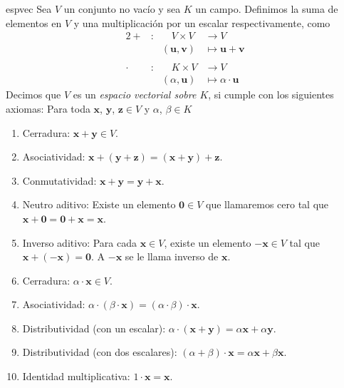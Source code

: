 \begin{definicion}{}{espvec}
    Sea $V$ un conjunto no vacío y sea $K$ un campo. Definimos la suma de elementos en $V$ y una multiplicación por un escalar respectivamente, como
    \begin{alignat*}{2}
        + &: & \quad V \times V & \longrightarrow V \\
        & & (\mathbf{u}, \mathbf{v}) & \longmapsto \mathbf{u} + \mathbf{v} \\
        & \\
        \cdot &: & \quad K \times V & \longrightarrow V \\
        & & (\alpha, \mathbf{u}) & \longmapsto \alpha \cdot \mathbf{u}
    \end{alignat*}
    Decimos que $V$ es un \emph{espacio vectorial sobre $K$}, si cumple con los siguientes axiomas: Para toda $\mathbf{x}$, $\mathbf{y}$, $\mathbf{z} \in V$ y $\alpha$, $\beta \in K$
    \begin{enumerate}[label=\roman*), topsep=6pt, itemsep=0pt]
        \item Cerradura: $\mathbf{x} + \mathbf{y} \in V$.
        \item Asociatividad: $\mathbf{x} + (\mathbf{y} + \mathbf {z}) = (\mathbf{x} + \mathbf{y}) + \mathbf{z}$.\newpage
        \item Conmutatividad: $\mathbf{x} + \mathbf{y} = \mathbf{y} + \mathbf{x}$.
        \item Neutro aditivo: Existe un elemento $\mathbf{0} \in V$ que llamaremos cero tal que $\mathbf{x} + \mathbf{0} = \mathbf{0} + \mathbf{x} = \mathbf{x}$.
        \item Inverso aditivo: Para cada $\mathbf{x} \in V$, existe un elemento $-\mathbf{x} \in V$ tal que $\mathbf{x} + (-\mathbf{x}) = \mathbf{0}$. A $-\mathbf{x}$ se le llama inverso de $\mathbf{x}$.
        \item Cerradura: $\alpha \cdot \mathbf{x} \in V$.
        \item Asociatividad: $\alpha \cdot (\beta \cdot \mathbf{x}) = (\alpha \cdot \beta) \cdot \mathbf{x}$.
        \item Distributividad (con un escalar): $\alpha \cdot (\mathbf{x} + \mathbf{y}) = \alpha \mathbf{x} + \alpha \mathbf{y}$.
        \item Distributividad (con dos escalares): $(\alpha + \beta) \cdot \mathbf{x} = \alpha \mathbf{x} + \beta \mathbf{x}$.
        \item Identidad multiplicativa: $1 \cdot \mathbf{x} = \mathbf{x}$.
    \end{enumerate}
\end{definicion}

